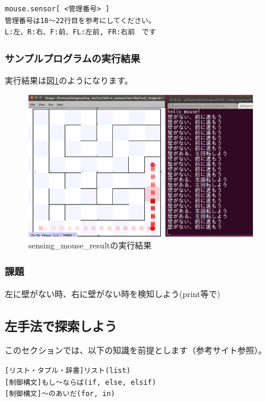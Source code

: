 \documentclass[11pt,a4paper]{jsarticle}
\begin{document}
\begin{lstlisting}[frame=single]
mouse.sensor[ <管理番号> ]
管理番号は18〜22行目を参考にしてください。
L:左、R:右、F:前、FL:左前, FR:右前　です
\end{lstlisting}



\subsubsection{サンプルプログラムの実行結果}
実行結果は図\ref{sensing_mouse_result}のようになります。
\begin{figure}[h]
  \begin{center}
    \includegraphics[width=100mm]{./sensing_mouse_result.png}
  \end{center}
  \label{sensing_mouse_result}
  \caption{sensing\_mouse\_resultの実行結果}
\end{figure}

\subsubsection{課題}
左に壁がない時、右に壁がない時を検知しよう(print等で)



\newpage
\subsection{左手法で探索しよう}
このセクションでは、以下の知識を前提とします（参考サイト参照）。
\begin{lstlisting}[frame=single]
[リスト・タプル・辞書]リスト(list)
[制御構文]もし～ならば(if, else, elsif)
[制御構文]～のあいだ(for, in)
\end{lstlisting}
\end{document}
